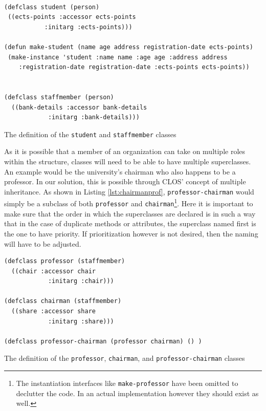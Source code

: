\documentclass[oribibl]{llncs}
\begin{document}
\begin{listing}[]%
 \centering
\begin{verbatim}

(defclass student (person)
 ((ects-points :accessor ects-points
           :initarg :ects-points)))

(defun make-student (name age address registration-date ects-points)
 (make-instance 'student :name name :age age :address address
    :registration-date registration-date :ects-points ects-points))
    
    
(defclass staffmember (person)
  ((bank-details :accessor bank-details
            :initarg :bank-details)))

\end{verbatim}
\caption{The definition of the \texttt{student} and \texttt{staffmember} classes}
\label{lst:student}
\end{listing}


As it is possible that a member of an organization can take on multiple roles within the structure, classes will need to be able to have multiple superclasses. An example would be the university's chairman who also happens to be a professor. In our solution, this is possible through CLOS' concept of multiple inheritance. As shown in Listing \ref{lst:chairmanprof}, \texttt{professor-chairman} would simply be a subclass of both \texttt{professor} and \texttt{chairman}\footnote{The instantiation interfaces like \texttt{make-professor} have been omitted to declutter the code. In an actual implementation however they should exist as well.}. Here it is important to make sure that the order in which the superclasses are declared is in such a way that in the case of duplicate methods or attributes, the superclass named first is the one to have priority. If prioritization however is not desired, then the naming will have to be adjusted.

\begin{listing}[]%
 \centering
\begin{verbatim}
(defclass professor (staffmember)
  ((chair :accessor chair
            :initarg :chair)))

(defclass chairman (staffmember)
  ((share :accessor share
            :initarg :share)))

(defclass professor-chairman (professor chairman) () )

\end{verbatim}
\caption{The definition of the \texttt{professor}, \texttt{chairman}, and \texttt{professor-chairman} classes}
\label{lst:chairmanprof}
\end{listing}
\end{document}
